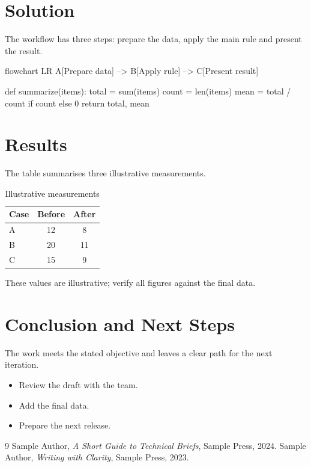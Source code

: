 \documentclass[11pt,a4paper]{article}
\begin{document}
  \section{Solution}
  The workflow has three steps: prepare the data, apply the main rule and
  present the result.

  \begin{mermaid}[style=editorial,width=0.82\linewidth,
      caption={Overview of the solution workflow},pos=H]
    flowchart LR
    A[Prepare data] --> B[Apply rule] --> C[Present result]
  \end{mermaid}

  \begin{code}[lang=python,numbers=true]
def summarize(items):
    total = sum(items)
    count = len(items)
    mean = total / count if count else 0
    return total, mean
  \end{code}

  \section{Results}
  The table summarises three illustrative measurements.
  \begin{table}[H]
    \centering
    \caption{Illustrative measurements}
    \begin{tabular}{@{}lcc@{}}
      \toprule
      Case & Before & After \\
      \midrule
      A & 12 & 8 \\
      B & 20 & 11 \\
      C & 15 & 9 \\
      \bottomrule
    \end{tabular}
  \end{table}
  \begin{cautionBox}
    These values are illustrative; verify all figures against the final data.
  \end{cautionBox}

  \section{Conclusion and Next Steps}
  The work meets the stated objective and leaves a clear path for the next
  iteration.
  \begin{itemize}[label=$\square$]
    \item Review the draft with the team.
    \item Add the final data.
    \item Prepare the next release.
  \end{itemize}

  \begin{thebibliography}{9}
     Sample Author, \textit{A Short Guide to Technical Briefs}, Sample Press, 2024.
     Sample Author, \textit{Writing with Clarity}, Sample Press, 2023.
  \end{thebibliography}
\end{document}
